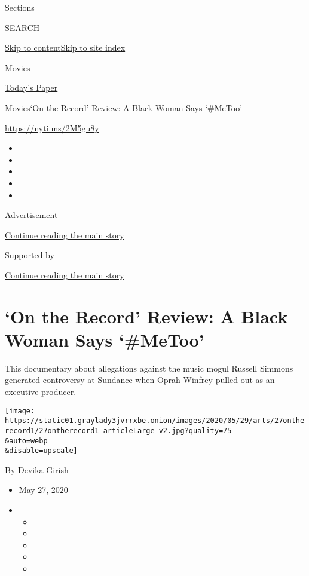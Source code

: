 Sections

SEARCH

\protect\hyperlink{site-content}{Skip to
content}\protect\hyperlink{site-index}{Skip to site index}

\href{https://www.nytimes3xbfgragh.onion/section/movies}{Movies}

\href{https://myaccount.nytimes3xbfgragh.onion/auth/login?response_type=cookie\&client_id=vi}{}

\href{https://www.nytimes3xbfgragh.onion/section/todayspaper}{Today's
Paper}

\href{/section/movies}{Movies}\textbar{}`On the Record' Review: A Black
Woman Says `\#MeToo'

\url{https://nyti.ms/2M5gu8y}

\begin{itemize}
\item
\item
\item
\item
\item
\end{itemize}

Advertisement

\protect\hyperlink{after-top}{Continue reading the main story}

Supported by

\protect\hyperlink{after-sponsor}{Continue reading the main story}

\hypertarget{on-the-record-review-a-black-woman-says-metoo}{%
\section{`On the Record' Review: A Black Woman Says
`\#MeToo'}\label{on-the-record-review-a-black-woman-says-metoo}}

This documentary about allegations against the music mogul Russell
Simmons generated controversy at Sundance when Oprah Winfrey pulled out
as an executive producer.

\texttt{[image: https://static01.graylady3jvrrxbe.onion/images/2020/05/29/arts/27ontherecord1/27ontherecord1-articleLarge-v2.jpg?quality=75\\\&auto=webp\\\&disable=upscale]}

By Devika Girish

\begin{itemize}
\item
  May 27, 2020
\item
  \begin{itemize}
  \item
  \item
  \item
  \item
  \item
  \end{itemize}
\end{itemize}


